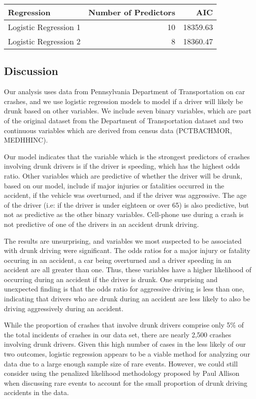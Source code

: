 \documentclass[
]{article}
\begin{document}
\begin{table}
\centering
\begin{tabular}[t]{l|r|r}
\hline
Regression & Number of Predictors & AIC\\
\hline
Logistic Regression 1 & 10 & 18359.63\\
\hline
Logistic Regression 2 & 8 & 18360.47\\
\hline
\end{tabular}
\end{table}

\hypertarget{discussion}{%
\subsection{Discussion}\label{discussion}}

Our analysis uses data from Pennsylvania Department of Transportation on
car crashes, and we use logistic regression models to model if a driver
will likely be drunk based on other variables. We include seven binary
variables, which are part of the original dataset from the Department of
Transportation dataset and two continuous variables which are derived
from census data (PCTBACHMOR, MEDHHINC).

Our model indicates that the variable which is the strongest predictors
of crashes involving drunk drivers is if the driver is speeding, which
has the highest odds ratio. Other variables which are predictive of
whether the driver will be drunk, based on our model, include if major
injuries or fatalities occurred in the accident, if the vehicle was
overturned, and if the driver was aggressive. The age of the driver
(i.e: if the driver is under eighteen or over 65) is also predictive,
but not as predictive as the other binary variables. Cell-phone use
during a crash is not predictive of one of the drivers in an accident
drunk driving.

The results are unsurprising, and variables we most suspected to be
associated with drunk driving were significant. The odds ratios for a
major injury or fatality occuring in an accident, a car being overturned
and a driver speeding in an accident are all greater than one. Thus,
these variables have a higher likelihood of occurring during an accident
if the driver is drunk. One surprising and unexpected finding is that
the odds ratio for aggressive driving is less than one, indicating that
drivers who are drunk during an accident are less likely to also be
driving aggressively during an accident.

While the proportion of crashes that involve drunk drivers comprise only
5\% of the total incidents of crashes in our data set, there are nearly
2,500 crashes involving drunk drivers. Given this high number of cases
in the less likely of our two outcomes, logistic regression appears to
be a viable method for analyzing our data due to a large enough sample
size of rare events. However, we could still consider using the
penalized likelihood methodology proposed by Paul Allison when
discussing rare events to account for the small proportion of drunk
driving accidents in the data.
\end{document}
